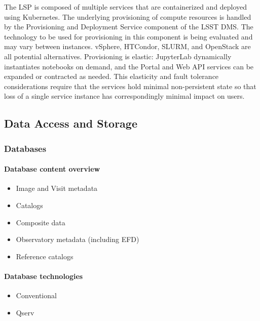 The LSP is composed of multiple services that are containerized and deployed
using Kubernetes.  The underlying provisioning of compute resources is handled
by the Provisioning and Deployment Service component of the LSST DMS.  The
technology to be used for provisioning in this component is being evaluated and
may vary between instances.  vSphere, HTCondor, SLURM, and OpenStack are all
potential alternatives.  Provisioning is elastic: JupyterLab dynamically
instantiates notebooks on demand, and the Portal and Web API services can be
expanded or contracted as needed.  This elasticity and fault tolerance
considerations require that the services hold minimal non-persistent state so
that loss of a single service instance has correspondingly minimal impact on
users.

\subsection{Data Access and Storage}\label{data-access-and-storage}


\subsubsection{Databases}\label{databases}

\paragraph{Database content overview}\label{database-content-overview}

\begin{itemize}
\item Image and Visit metadata
\item Catalogs
\item Composite data
\item Observatory metadata (including EFD)
\item Reference catalogs
\end{itemize}

\paragraph{Database technologies}\label{database-technologies}

\begin{itemize}
\item Conventional
\item Qserv
\end{itemize}

